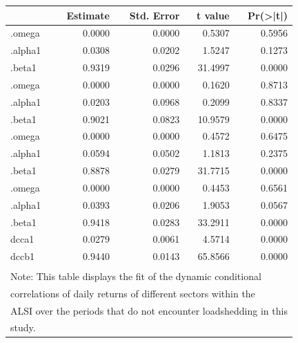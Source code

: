 \documentclass[11pt,preprint, authoryear]{elsarticle}
\let\origtable\table
\let\endorigtable\endtable
\renewenvironment{table}[1][2] {
    \expandafter\origtable\expandafter[H]
} {
    \endorigtable
}
\numberwithin{equation}{section}
\numberwithin{figure}{section}
\numberwithin{table}{section}
\begin{document}
\begin{table}
\centering\begingroup\fontsize{9}{11}\selectfont

\begin{tabular}{l|r|r|r|r}
\hline
  &  Estimate &  Std. Error &  t value & Pr(>|t|)\\
\hline
[Financials].omega & 0.0000 & 0.0000 & 0.5307 & 0.5956\\
\hline
[Financials].alpha1 & 0.0308 & 0.0202 & 1.5247 & 0.1273\\
\hline
[Financials].beta1 & 0.9319 & 0.0296 & 31.4997 & 0.0000\\
\hline
[Industrials].omega & 0.0000 & 0.0000 & 0.1620 & 0.8713\\
\hline
[Industrials].alpha1 & 0.0203 & 0.0968 & 0.2099 & 0.8337\\
\hline
[Industrials].beta1 & 0.9021 & 0.0823 & 10.9579 & 0.0000\\
\hline
[Property].omega & 0.0000 & 0.0000 & 0.4572 & 0.6475\\
\hline
[Property].alpha1 & 0.0594 & 0.0502 & 1.1813 & 0.2375\\
\hline
[Property].beta1 & 0.8878 & 0.0279 & 31.7715 & 0.0000\\
\hline
[Resources].omega & 0.0000 & 0.0000 & 0.4453 & 0.6561\\
\hline
[Resources].alpha1 & 0.0393 & 0.0206 & 1.9053 & 0.0567\\
\hline
[Resources].beta1 & 0.9418 & 0.0283 & 33.2911 & 0.0000\\
\hline
[Joint]dcca1 & 0.0279 & 0.0061 & 4.5714 & 0.0000\\
\hline
[Joint]dccb1 & 0.9440 & 0.0143 & 65.8566 & 0.0000\\
\hline
\multicolumn{5}{l}{\textsuperscript{} Note: This table displays the fit of the dynamic conditional}\\
\multicolumn{5}{l}{correlations of daily returns of different sectors within the}\\
\multicolumn{5}{l}{ALSI over the periods that do not encounter loadshedding in this}\\
\multicolumn{5}{l}{study.}\\
\end{tabular}
\endgroup{}
\end{table}
\end{document}
